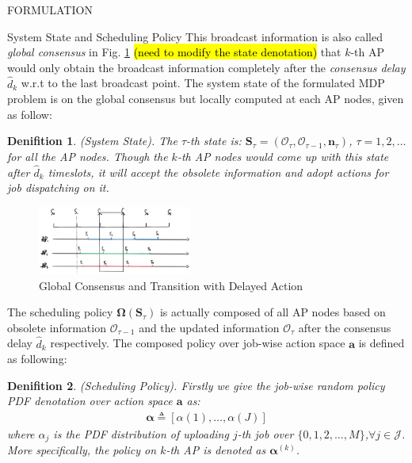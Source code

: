 \documentclass[10pt, conference, letterpaper]{IEEEtran}
\newtheorem{definition}{Denifition}
\renewcommand{\vec}{\mathbf}
\newcommand{\Stat}{\mathbf{S}}
\newcommand{\Obsv}{\mathcal{O}}
\begin{document}
\begin{section}{FORMULATION}
\begin{subsection}{System State and Scheduling Policy}
            This broadcast information is also called \emph{global consensus} in Fig. \ref{fig:br-trans} \hl{(need to modify the state denotation)} that $k$-th AP would only obtain the broadcast information completely after the \emph{consensus delay} $\hat{d}_{k}$ w.r.t to the last broadcast point. The system state of the formulated MDP problem is on the global consensus but locally computed at each AP nodes, given as follow:
            \begin{definition}(System State).
                The $\tau$-th state is: $\Stat_\tau = (\Obsv_{\tau}, \Obsv_{\tau-1}, \vec{n}_\tau)$, $\tau=1,2,\dots$ for all the AP nodes. Though the $k$-th AP nodes would come up with this state after $\hat{d}_k$ timeslots, it will accept the obsolete information and adopt actions for job dispatching on it.
            \end{definition}
            \begin{figure}[ht]
                \centering
                \includegraphics[width=0.45\textwidth]{broadcast-trans.png}
                \caption{Global Consensus and Transition with Delayed Action}
                \label{fig:br-trans}
            \end{figure}

            The scheduling policy $\vec{\Omega}(\Stat_\tau)$ is actually composed of all AP nodes based on obsolete information $\Obsv_{\tau-1}$ and the updated information $\Obsv_{\tau}$ after the consensus delay $\hat{d}_k$ respectively. The composed policy over job-wise action space $\vec{a}$ is defined as following:
            \begin{definition}(Scheduling Policy).
                Firstly we give the job-wise random policy PDF denotation over action space $\vec{a}$ as:
                \begin{align}
                    \vec{\alpha} \triangleq [\alpha(1), \dots, \alpha(J)]
                \end{align}
                where $\alpha_j$ is the PDF distribution of uploading $j$-th job over $\{0,1,2,\dots,M\}$,$\forall j \in \mathcal{J}$. More specifically, the policy on $k$-th AP is denoted as $\vec{\alpha}^{(k)}$.


\end{definition}
\end{subsection}
\end{section}
\end{document}
